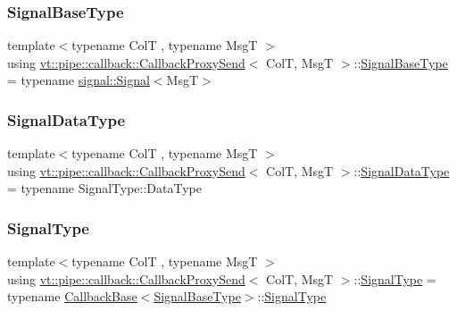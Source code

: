 \subsubsection{\texorpdfstring{Signal\+Base\+Type}{SignalBaseType}}
{\footnotesize\ttfamily template$<$typename ColT , typename MsgT $>$ \\
using \hyperlink{structvt_1_1pipe_1_1callback_1_1_callback_proxy_send}{vt\+::pipe\+::callback\+::\+Callback\+Proxy\+Send}$<$ ColT, MsgT $>$\+::\hyperlink{structvt_1_1pipe_1_1callback_1_1_callback_proxy_send_a29a3c5e7cc3dc714225103d1a4d8856d}{Signal\+Base\+Type} =  typename \hyperlink{structvt_1_1pipe_1_1signal_1_1_signal}{signal\+::\+Signal}$<$MsgT$>$}

\mbox{\label{structvt_1_1pipe_1_1callback_1_1_callback_proxy_send_a2a8b17dedeb5cc2b68ca5c7386796ef3}} 
\subsubsection{\texorpdfstring{Signal\+Data\+Type}{SignalDataType}}
{\footnotesize\ttfamily template$<$typename ColT , typename MsgT $>$ \\
using \hyperlink{structvt_1_1pipe_1_1callback_1_1_callback_proxy_send}{vt\+::pipe\+::callback\+::\+Callback\+Proxy\+Send}$<$ ColT, MsgT $>$\+::\hyperlink{structvt_1_1pipe_1_1callback_1_1_callback_proxy_send_a2a8b17dedeb5cc2b68ca5c7386796ef3}{Signal\+Data\+Type} =  typename Signal\+Type\+::\+Data\+Type}

\mbox{\label{structvt_1_1pipe_1_1callback_1_1_callback_proxy_send_a6c3776f3cfa93c54603d0b4245291979}} 
\subsubsection{\texorpdfstring{Signal\+Type}{SignalType}}
{\footnotesize\ttfamily template$<$typename ColT , typename MsgT $>$ \\
using \hyperlink{structvt_1_1pipe_1_1callback_1_1_callback_proxy_send}{vt\+::pipe\+::callback\+::\+Callback\+Proxy\+Send}$<$ ColT, MsgT $>$\+::\hyperlink{structvt_1_1pipe_1_1callback_1_1_callback_proxy_send_a6c3776f3cfa93c54603d0b4245291979}{Signal\+Type} =  typename \hyperlink{structvt_1_1pipe_1_1callback_1_1_callback_base}{Callback\+Base}$<$\hyperlink{structvt_1_1pipe_1_1callback_1_1_callback_proxy_send_a29a3c5e7cc3dc714225103d1a4d8856d}{Signal\+Base\+Type}$>$\+::\hyperlink{structvt_1_1pipe_1_1callback_1_1_callback_proxy_send_a6c3776f3cfa93c54603d0b4245291979}{Signal\+Type}}



